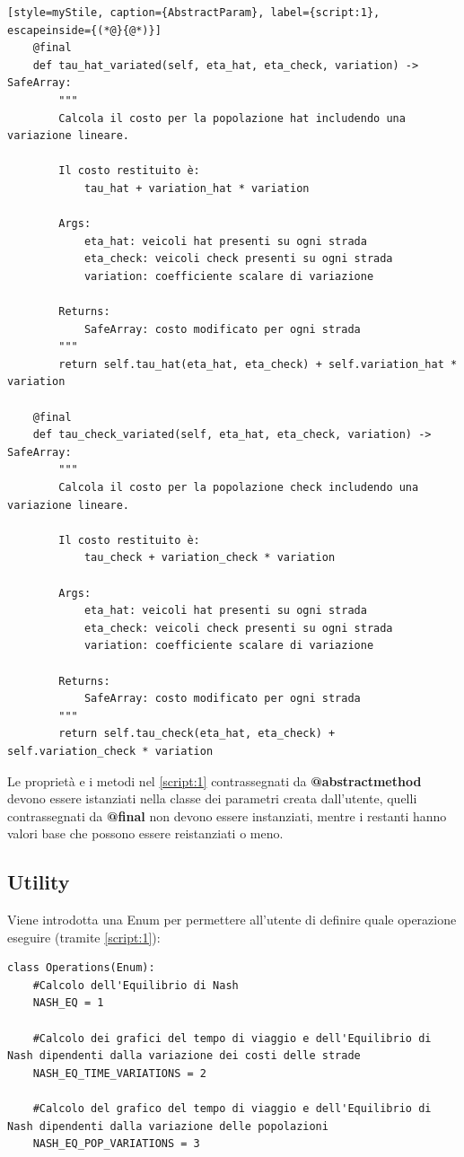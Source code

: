 \begin{lstlisting}[style=myStile, caption={AbstractParam}, label={script:1}, escapeinside={(*@}{@*)}]
    @final
    def tau_hat_variated(self, eta_hat, eta_check, variation) -> SafeArray:
        """
        Calcola il costo per la popolazione hat includendo una variazione lineare.
        
        Il costo restituito è:
            tau_hat + variation_hat * variation
        
        Args:
            eta_hat: veicoli hat presenti su ogni strada
            eta_check: veicoli check presenti su ogni strada
            variation: coefficiente scalare di variazione
        
        Returns:
            SafeArray: costo modificato per ogni strada
        """
        return self.tau_hat(eta_hat, eta_check) + self.variation_hat * variation

    @final
    def tau_check_variated(self, eta_hat, eta_check, variation) -> SafeArray:
        """
        Calcola il costo per la popolazione check includendo una variazione lineare.
        
        Il costo restituito è:
            tau_check + variation_check * variation
        
        Args:
            eta_hat: veicoli hat presenti su ogni strada
            eta_check: veicoli check presenti su ogni strada
            variation: coefficiente scalare di variazione
        
        Returns:
            SafeArray: costo modificato per ogni strada
        """
        return self.tau_check(eta_hat, eta_check) + self.variation_check * variation
\end{lstlisting}
Le proprietà e i metodi nel \autoref{script:1} contrassegnati da \textbf{@abstractmethod} devono essere istanziati nella classe dei parametri creata dall'utente, quelli
contrassegnati da \textbf{@final} non devono essere instanziati, mentre i restanti hanno valori base che possono essere reistanziati o meno.

\subsection{Utility}
\label{subsec:Utility}

Viene introdotta una Enum per permettere all'utente di definire quale operazione eseguire (tramite \autoref{script:1}):
\begin{lstlisting}[style=myStile, caption={Operations}, label={script:2}]
  class Operations(Enum):
    #Calcolo dell'Equilibrio di Nash
    NASH_EQ = 1 

    #Calcolo dei grafici del tempo di viaggio e dell'Equilibrio di Nash dipendenti dalla variazione dei costi delle strade
    NASH_EQ_TIME_VARIATIONS = 2

    #Calcolo del grafico del tempo di viaggio e dell'Equilibrio di Nash dipendenti dalla variazione delle popolazioni
    NASH_EQ_POP_VARIATIONS = 3
\end{lstlisting}

